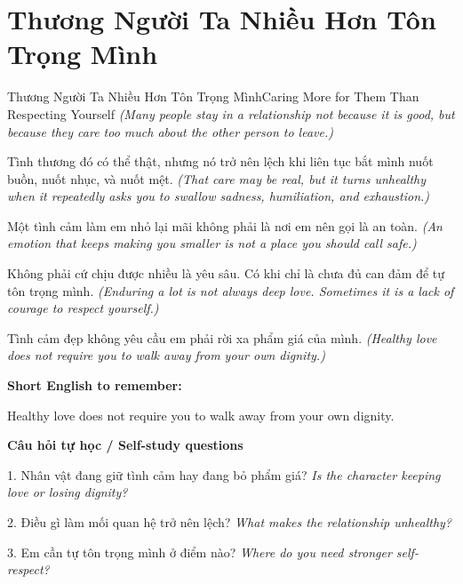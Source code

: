 \section{Thương Người Ta Nhiều Hơn Tôn Trọng Mình}
\begin{truyen}{Thương Người Ta Nhiều Hơn Tôn Trọng Mình}{Caring More for Them Than Respecting Yourself}
\textit{(Many people stay in a relationship not because it is good, but because they care too much about the other person to leave.)}

Tình thương đó có thể thật, nhưng nó trở nên lệch khi liên tục bắt mình nuốt buồn, nuốt nhục, và nuốt mệt.
\textit{(That care may be real, but it turns unhealthy when it repeatedly asks you to swallow sadness, humiliation, and exhaustion.)}

Một tình cảm làm em nhỏ lại mãi không phải là nơi em nên gọi là an toàn.
\textit{(An emotion that keeps making you smaller is not a place you should call safe.)}

Không phải cứ chịu được nhiều là yêu sâu. Có khi chỉ là chưa đủ can đảm để tự tôn trọng mình.
\textit{(Enduring a lot is not always deep love. Sometimes it is a lack of courage to respect yourself.)}

\end{truyen}

\begin{baihoc}
Tình cảm đẹp không yêu cầu em phải rời xa phẩm giá của mình.
\textit{(Healthy love does not require you to walk away from your own dignity.)}
\end{baihoc}

\begin{ghinhoanh}
\textbf{Short English to remember:}

Healthy love does not require you to walk away from your own dignity.

\end{ghinhoanh}

\begin{tuhocnhanh}
\textbf{Câu hỏi tự học / Self-study questions}

1. Nhân vật đang giữ tình cảm hay đang bỏ phẩm giá? \textit{Is the character keeping love or losing dignity?}

2. Điều gì làm mối quan hệ trở nên lệch? \textit{What makes the relationship unhealthy?}

3. Em cần tự tôn trọng mình ở điểm nào? \textit{Where do you need stronger self-respect?}
\end{tuhocnhanh}
\ngancach

